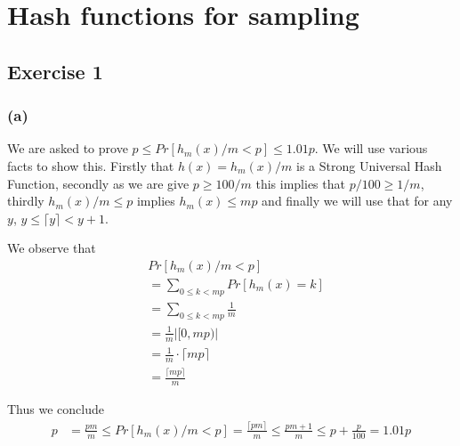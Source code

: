 \section{Hash functions for sampling}
\subsection{Exercise 1}
\subsubsection{(a)}

We are asked to prove \(p \leq Pr[h_m(x)/m < p] \leq 1.01p\).
We will use various facts to show this. Firstly that \(h(x) = h_m(x)/m\) is a Strong Universal Hash Function, secondly as we are give \(p \ge 100/m \) this implies that \(p/100\ge 1/m\), thirdly \(h_m(x)/m \le p \) implies \(h_m(x) \le mp  \)  and finally we will use that for any \(y\),   \(y \leq \lceil y \rceil < y+1\).

We observe that
\begin{align*}
	& Pr[h_m(x)/m < p] \\
	&= \sum_{0 \leq k < mp} Pr[h_m(x) = k] \\
	&= \sum_{0 \leq k < mp} \frac{1}{m} \\
	&= \frac{1}{m} \left| [0,mp) \right| \\
	&= \frac{1}{m} \cdot \lceil mp \rceil \\
	&= \frac{\lceil mp \rceil}{m}
\end{align*}

Thus we conclude
\begin{align*}
	p 	&= \frac{pm}{m} \leq Pr[h_m(x)/m < p] = \frac{\lceil pm \rceil}{m} \leq \frac{pm+1}{m} 
		\leq p + \frac{p}{100} = 1.01p
\end{align*}


